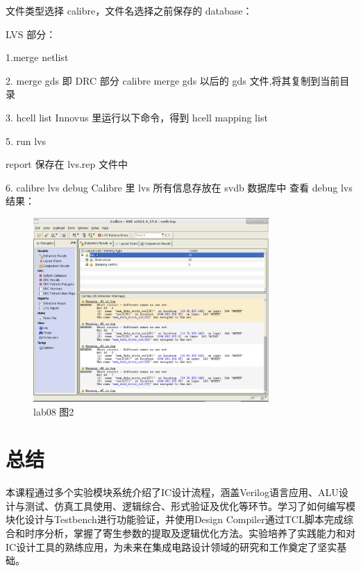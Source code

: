 文件类型选择 calibre，文件名选择之前保存的 database：

LVS 部分：

1.merge netlist

2. merge gds 即 DRC 部分 calibre merge gds 以后的 gds 文件,将其复制到当前目录

3. hcell list Innovus 里运行以下命令，得到 hcell mapping list

5. run lvs

report 保存在 lvs.rep 文件中

6. calibre lvs debug Calibre 里 lvs 所有信息存放在 svdb 数据库中 查看 debug lvs 结果：

\begin{figure}[H]
    \centering
    \includegraphics[width=0.8\textwidth]{images/lab08-02.png}
    \caption{lab08 图2}
\end{figure}

\section{总结}

本课程通过多个实验模块系统介绍了IC设计流程，涵盖Verilog语言应用、ALU设计与测试、仿真工具使用、逻辑综合、形式验证及优化等环节。学习了如何编写模块化设计与Testbench进行功能验证，并使用Design Compiler通过TCL脚本完成综合和时序分析，掌握了寄生参数的提取及逻辑优化方法。实验培养了实践能力和对IC设计工具的熟练应用，为未来在集成电路设计领域的研究和工作奠定了坚实基础。
